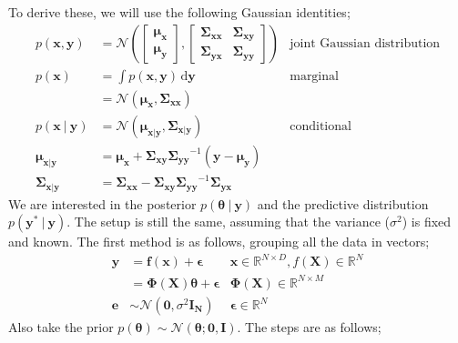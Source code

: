 \documentclass[a4paper, 12pt]{article}
\newcommand{\indefint}[2]{\int #1 \, \mathrm{d}#2}
\newcommand{\mat}[1]{\boldsymbol{#1}}
\renewcommand{\vec}[1]{\boldsymbol{#1}}
\newcommand{\mbbr}[0]{\mathbb{R}}
\begin{document}
            To derive these, we will use the following Gaussian identities;
            \begin{align*}
                p(\vec{x}, \vec{y}) & = \mathcal{N}\left(\begin{bmatrix}
                    \vec{\mu_x} \\ \vec{\mu_y}
                \end{bmatrix}, \begin{bmatrix}
                    \mat{\Sigma_{xx}} & \mat{\Sigma_{xy}} \\
                    \mat{\Sigma_{yx}} & \mat{\Sigma_{yy}}
                \end{bmatrix}\right) & \text{joint Gaussian distribution} \\
                p(\vec{x}) & = \indefint{p(\vec{x}, \vec{y})}{\vec{y}} & \text{marginal} \\
                & = \mathcal{N}(\vec{\mu_x}, \mat{\Sigma_{xx}}) \\
                p(\vec{x}\ |\ \vec{y}) & = \mathcal{N}(\vec{\mu}_{\vec{x}|\vec{y}}, \mat{\Sigma}_{\vec{x}|\vec{y}}) & \text{conditional} \\
                \vec{\mu}_{\vec{x}|\vec{y}} & = \vec{\mu_x} + \mat{\Sigma_{xy}}\mat{\Sigma_{yy}}^{-1}(\vec{y} - \vec{\mu_y}) \\
                \mat{\Sigma}_{\vec{x}|\vec{y}} & = \mat{\Sigma_{xx}} - \mat{\Sigma_{xy}}\mat{\Sigma_{yy}}^{-1}\mat{\Sigma_{yx}}
            \end{align*}
            We are interested in the posterior $p(\vec{\theta}\ |\ \vec{y})$ and the predictive distribution $p(\vec{y^*}\ |\ \vec{y})$.
            The setup is still the same, assuming that the variance ($\sigma^2$) is fixed and known.
            The first method is as follows, grouping all the data in vectors;
            \begin{align*}
                \vec{y} & = \vec{f}(\mat{x}) + \vec{\epsilon} & \mat{x} \in \mbbr^{N \times D}, f(\mat{X}) \in \mbbr^N \\
                & = \mat{\Phi}(\mat{X}) \vec{\theta} + \vec{\epsilon} & \mat{\Phi}(\mat{X}) \in \mbbr^{N \times M} \\
                \vec{e} & \sim \mathcal{N}(\vec{0}, \sigma^2\mat{I_N}) & \vec{\epsilon} \in \mbbr^N
            \end{align*}
            Also take the prior $p(\vec{\theta}) \sim \mathcal{N}(\vec{\theta}; \vec{0}, \mat{I})$.
            The steps are as follows;
\end{document}
